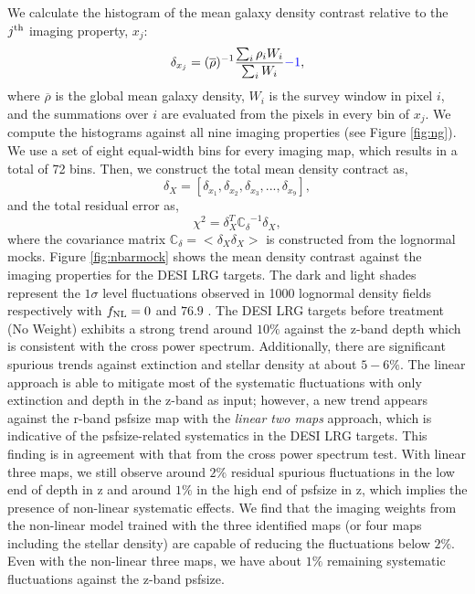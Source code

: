 We calculate the histogram of the mean galaxy density contrast relative to the $j^{\rm th}$ imaging property, $x_{j}$:
\begin{equation}
\delta_{x_{j}} = ({\overline{\rho}})^{-1} \frac{\sum_{i} \rho_{i} W_{i}}{\sum_{i} W_{i}} \textcolor{blue}{- 1},
\end{equation}
where $\overline{\rho}$ is the global mean galaxy density, $W_{i}$ is the survey window in pixel $i$, and the summations over $i$ are evaluated from the pixels in every bin of $x_{j}$. We compute the histograms against all nine imaging properties (see Figure \ref{fig:ng}). We use a set of eight equal-width bins for every imaging map, which results in a total of 72 bins. Then, we construct the total mean density contract as,
\begin{equation}
\delta_{X} = [\delta_{x_{1}}, \delta_{x_{2}}, \delta_{x_{3}}, ..., \delta_{x_{9}}],
\end{equation}
and the total residual error as,
\begin{equation}
\chi^{2} = \delta_{X}^{T} \mathbb{C_{\delta}}^{-1} \delta_{X},
\end{equation}
where the covariance matrix $\mathbb{C}_{\delta} = < \delta_{X} \delta_{X}>$ is constructed from the lognormal mocks. Figure \ref{fig:nbarmock} shows the mean density contrast against the imaging properties for the DESI LRG targets. The dark and light shades represent the $1\sigma$ level fluctuations observed in 1000 lognormal density fields respectively with $f_{\rm NL}=0$ and $76.9$ . The DESI LRG targets before treatment (No Weight) exhibits a strong trend around $10\%$ against the z-band depth which is consistent with the cross power spectrum. Additionally, there are significant spurious trends against extinction and stellar density at about $5-6\%$. The linear approach is able to mitigate most of the systematic fluctuations with only extinction and depth in the z-band as input; however, a new trend appears against the r-band psfsize map with the \textit{linear two maps} approach, which is indicative of the psfsize-related systematics in the DESI LRG targets. This finding is in agreement with that from the cross power spectrum test. With linear three maps, we still observe around $2\%$ residual spurious fluctuations in the low end of depth in z and around $1\%$ in the high end of psfsize in z, which implies the presence of non-linear systematic effects. We find that the imaging weights from the non-linear model trained with the three identified maps (or four maps including the stellar density) are capable of reducing the fluctuations below $2\%$. Even with the non-linear three maps, we have about $1\%$ remaining systematic fluctuations against the z-band psfsize.   

